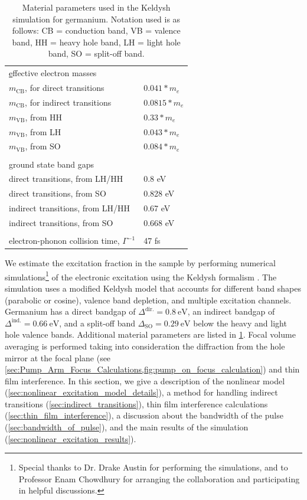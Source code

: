 \begin{table}[]
	\centering
	\begin{tabular}{ll}
		{\ul effective electron masses} &  \\
		$m_{\textrm{CB}}$, for direct transitions & $0.041 * m_e$ \\
		$m_{\textrm{CB}}$, for indirect transitions & $0.0815 * m_e$ \\
		$m_{\textrm{VB}}$, from HH & $0.33 * m_e$ \\
		$m_{\textrm{VB}}$, from LH & $0.043 * m_e$ \\
		$m_{\textrm{VB}}$, from SO & $0.084 * m_e$ \\
		&  \\
		{\ul ground state band gaps} &  \\
		direct transitions, from LH/HH & 0.8 eV \\
		direct transitions,  from SO & 0.828 eV \\
		indirect transitions,  from LH/HH & 0.67 eV \\
		indirect transitions, from SO & 0.668 eV \\
		&  \\
		electron-phonon collision time, $\Gamma^{-1}$ & 47 fs
	\end{tabular}
	\caption{Material parameters used in the Keldysh simulation for germanium. Notation used is as follows: CB = conduction band, VB = valence band, HH = heavy hole band, LH = light hole band, SO = split-off band.}
	\label{tab:Keldysh_parameters}
\end{table}

We estimate the excitation fraction in the sample by performing numerical simulations\footnote{Special thanks to Dr. Drake Austin for performing the simulations, and to Professor Enam Chowdhury for arranging the collaboration and participating in helpful discussions.} of the electronic excitation using the Keldysh formalism \cite{sergaevaUltrafastExcitationConductionband2018,keldyshIonizationFieldStrong1965,vpopruzhenkoKeldyshTheoryStrong2014}. The simulation uses a modified Keldysh model that accounts for different band shapes (parabolic or cosine), valence band depletion, and multiple excitation channels. Germanium has a direct bandgap of $\Delta^{\textrm{dir.}} = 0.8 \ \textrm{eV}$, an indirect bandgap of $\Delta^{\textrm{ind.}} = 0.66 \ \textrm{eV}$, and a split-off band $\Delta_{\textrm{SO}} = 0.29 \ \textrm{eV}$ below the heavy and light hole valence bands. Additional material parameters are listed in \cref{tab:Keldysh_parameters}. Focal volume averaging is performed taking into consideration the diffraction from the hole mirror at the focal plane (see \cref{sec:Pump_Arm_Focus_Calculations,fig:pump_on_focus_calculation}) and thin film interference. In this section, we give a description of the nonlinear model (\cref{sec:nonlinear_excitation_model_details}), a method for handling indirect transitions (\cref{sec:indirect_transitions}), thin film interference calculations (\cref{sec:thin_film_interference}), a discussion about the bandwidth of the pulse (\cref{sec:bandwidth_of_pulse}), and the main results of the simulation (\cref{sec:nonlinear_excitation_results}).

